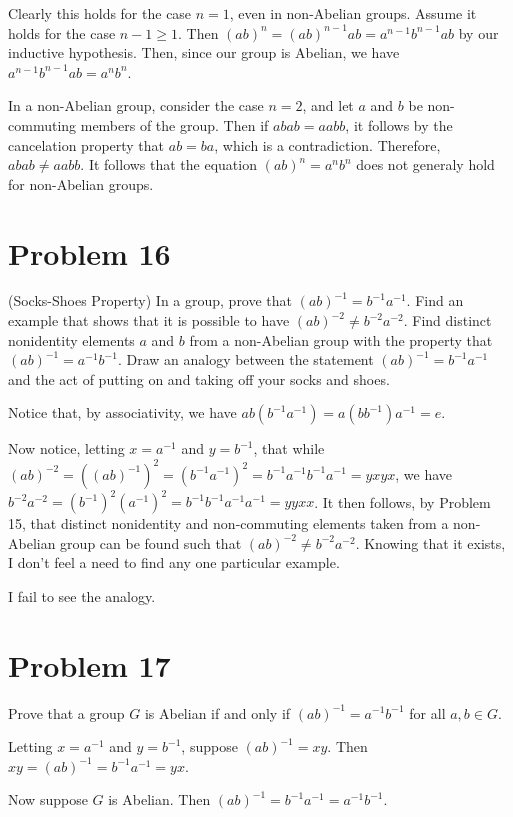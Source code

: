 \documentclass[12pt]{article}
\begin{document}
Clearly this holds for the case $n=1$, even in non-Abelian groups.
Assume it holds for the case $n-1\geq 1$.  Then $(ab)^n=(ab)^{n-1}ab = a^{n-1}b^{n-1}ab$
by our inductive hypothesis.  Then, since our group is Abelian, we have $a^{n-1}b^{n-1}ab=a^nb^n$.

In a non-Abelian group, consider the case $n=2$, and let $a$ and $b$ be non-commuting members of the group.
Then if $abab=aabb$, it follows by the cancelation property that $ab=ba$, which is a contradiction.
Therefore, $abab\neq aabb$.  It follows that the equation $(ab)^n= a^nb^n$ does not generaly hold for non-Abelian groups.

\section*{Problem 16}

(Socks-Shoes Property)  In a group, prove that $(ab)^{-1}=b^{-1}a^{-1}$.  Find
an example that shows that it is possible to have $(ab)^{-2}\neq b^{-2}a^{-2}$.  Find
distinct nonidentity elements $a$ and $b$ from a non-Abelian group with the
property that $(ab)^{-1}=a^{-1}b^{-1}$.  Draw an analogy between the statement $(ab)^{-1}=b^{-1}a^{-1}$
and the act of putting on and taking off your socks and shoes.

Notice that, by associativity, we have $ab(b^{-1}a^{-1}) = a(bb^{-1})a^{-1}=e$.

Now notice, letting $x=a^{-1}$ and $y=b^{-1}$, that while $(ab)^{-2}=((ab)^{-1})^2=(b^{-1}a^{-1})^2=b^{-1}a^{-1}b^{-1}a^{-1}=yxyx$,
we have $b^{-2}a^{-2}=(b^{-1})^2(a^{-1})^2=b^{-1}b^{-1}a^{-1}a^{-1}=yyxx$.
It then follows, by Problem 15, that distinct nonidentity and non-commuting elements taken from a
non-Abelian group can be found such that $(ab)^{-2}\neq b^{-2}a^{-2}$.  Knowing that it exists,
I don't feel a need to find any one particular example.

I fail to see the analogy.

\section*{Problem 17}

Prove that a group $G$ is Abelian if and only if $(ab)^{-1}=a^{-1}b^{-1}$ for all $a,b\in G$.

Letting $x=a^{-1}$ and $y=b^{-1}$,
suppose $(ab)^{-1}=xy$.  Then $xy=(ab)^{-1}=b^{-1}a^{-1}=yx$.

Now suppose $G$ is Abelian.  Then $(ab)^{-1}=b^{-1}a^{-1}=a^{-1}b^{-1}$.
\end{document}
